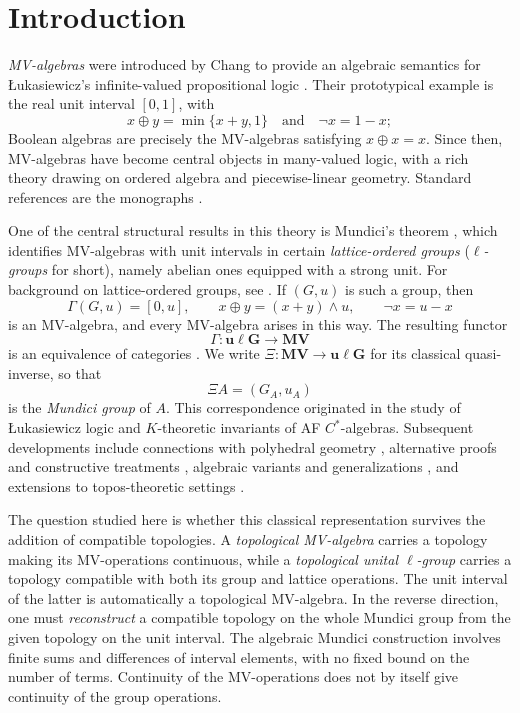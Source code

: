 \documentclass[preprint,3p]{elsarticle}
\theoremstyle{plain}
\theoremstyle{definition}
\newcommand{\uLG}{\mathbf{u\ell G}}
\newcommand{\MV}{\mathbf{MV}}
\numberwithin{equation}{section}
\begin{document}
\tableofcontents

\section{Introduction}
\label{sec-introduction}
\emph{MV-algebras} were introduced by Chang to provide an algebraic semantics for
\L ukasiewicz's infinite-valued propositional logic \cite{Chang1958}.
Their prototypical example is the real unit interval $[0,1]$, with
\[
x\oplus y=\min\{x+y,1\}\quad\text{and}\quad \neg x=1-x;
\]
Boolean algebras are precisely the MV-algebras satisfying $x\oplus x=x$.  
Since then, MV-algebras have 
become central objects in many-valued logic, with a rich theory drawing on 
ordered algebra and piecewise-linear geometry. Standard references are the 
monographs \cite{Cignoli2000a,Mundici2011}.

One of the central structural results in this theory is 
Mundici's theorem \cite{Mundici1986},
which identifies MV-algebras with unit intervals in certain
\emph{lattice-ordered groups} (\emph{$\ell$-groups} for short), namely
abelian ones equipped with a strong unit.  For background on
lattice-ordered groups, see
\cite{Birkhoff1942,Birkhoff1967,Darnel1994,Kopytov1994}.  If $(G,u)$ is such a group,
then
\begin{equation} \label{eq-Gamma-def}
 \Gamma(G,u)=[0,u],\qquad
 x\oplus y=(x+y)\wedge u,\qquad
 \neg x=u-x
\end{equation}
is an MV-algebra, and every MV-algebra arises in this way.  The resulting
functor
\[
 \Gamma\colon\uLG\longrightarrow\MV
\]
is an equivalence of categories \cite{Mundici1986,Cignoli1998}.  We write
$\Xi\colon\MV\longrightarrow\uLG$ for its classical quasi-inverse, so that
\[
\Xi A=(G_A,u_A)
\]
is the \emph{Mundici group} of $A$.  This correspondence originated in the 
study of \L ukasiewicz logic and
$K$-theoretic invariants of AF $C^*$-algebras.
Subsequent developments include connections with polyhedral geometry
\cite{Mundici1988}, alternative proofs and constructive treatments
\cite{Dubuc2015,MisselbeckWessel2026}, algebraic variants and generalizations
\cite{Abbadini2021,DiNola1994,Dvurecenskij2002,Kroupa2021},
and extensions to topos-theoretic settings \cite{Caramello2015}.

The question studied here is whether this classical representation
survives the addition of compatible topologies.  A \emph{topological
MV-algebra} \cite{Hoo1997} carries a topology making its MV-operations 
continuous, while a \emph{topological unital $\ell$-group} 
\cite{Smarda1967,Ball1979} carries a topology compatible with both
its group and lattice operations.  The unit interval of the latter is
automatically a topological MV-algebra.  In the reverse direction,
one must \emph{reconstruct} a compatible topology on the whole Mundici
group from the given topology on the unit interval.  The algebraic
Mundici construction involves finite sums and differences of interval
elements, with no fixed bound on the number of terms.  Continuity of
the MV-operations does not by itself give continuity of the group
operations.
\end{document}
